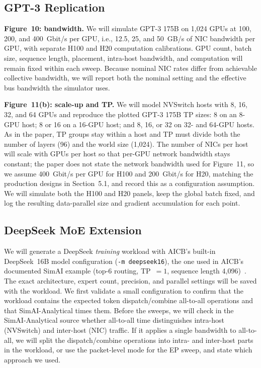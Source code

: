 \documentclass[letterpaper,twocolumn,10pt]{article}
\begin{document}
\subsection{GPT-3 Replication}
\textbf{Figure~10: bandwidth.} We will simulate GPT-3 175B on 1,024 GPUs at 100, 200, and 400~Gbit/s per GPU, i.e., 12.5, 25, and 50~GB/s of NIC bandwidth per GPU, with separate H100 and H20 computation calibrations. GPU count, batch size, sequence length, placement, intra-host bandwidth, and computation will remain fixed within each sweep. Because nominal NIC rates differ from achievable collective bandwidth, we will report both the nominal setting and the effective bus bandwidth the simulator uses.

\textbf{Figure~11(b): scale-up and TP.} We will model NVSwitch hosts with 8, 16, 32, and 64 GPUs and reproduce the plotted GPT-3 175B TP sizes: 8 on an 8-GPU host; 8 or 16 on a 16-GPU host; and 8, 16, or 32 on 32- and 64-GPU hosts. As in the paper, TP groups stay within a host and TP must divide both the number of layers (96) and the world size (1,024). The number of NICs per host will scale with GPUs per host so that per-GPU network bandwidth stays constant; the paper does not state the network bandwidth used for Figure~11, so we assume 400~Gbit/s per GPU for H100 and 200~Gbit/s for H20, matching the production designs in Section~5.1, and record this as a configuration assumption. We will simulate both the H100 and H20 panels, keep the global batch fixed, and log the resulting data-parallel size and gradient accumulation for each point.

\subsection{DeepSeek MoE Extension}
We will generate a DeepSeek \emph{training} workload with AICB's built-in DeepSeek~16B model configuration (\texttt{-m deepseek16}), the one used in AICB's documented SimAI example (top-6 routing, TP~$=1$, sequence length 4,096)~\cite{aicb}. The exact architecture, expert count, precision, and parallel settings will be saved with the workload. We first validate a small configuration to confirm that the workload contains the expected token dispatch/combine all-to-all operations and that SimAI-Analytical times them. Before the sweeps, we will check in the SimAI-Analytical source whether all-to-all time distinguishes intra-host (NVSwitch) and inter-host (NIC) traffic. If it applies a single bandwidth to all-to-all, we will split the dispatch/combine operations into intra- and inter-host parts in the workload, or use the packet-level mode for the EP sweep, and state which approach we used.
\end{document}
